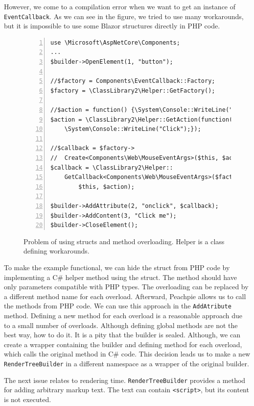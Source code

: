 However, we come to a compilation error when we want to get an instance of \texttt{EventCallback}.
As we can see in the figure, we tried to use many workarounds, but it is impossible to use some Blazor structures directly in PHP code.
\par
\begin{figure}
\begin{lstlisting}[numbers=left]
use \Microsoft\AspNetCore\Components;
...
$builder->OpenElement(1, "button");
		
//$factory = Components\EventCallback::Factory;
$factory = \ClassLibrary2\Helper::GetFactory();

//$action = function() {\System\Console::WriteLine("Click");}; 
$action = \ClassLibrary2\Helper::GetAction(function() {
	\System\Console::WriteLine("Click");});
		
//$callback = $factory->
//	Create<Components\Web\MouseEventArgs>($this, $action);
$callback = \ClassLibrary2\Helper::
	GetCallback<Components\Web\MouseEventArgs>($factory, 
		$this, $action);

$builder->AddAttribute(2, "onclick", $callback);
$builder->AddContent(3, "Click me");
$builder->CloseElement();
\end{lstlisting}
\caption{Problem of using structs and method overloading. Helper is a class defining workarounds.}
\label{img15:problems}
\end{figure}
\par
To make the example functional, we can hide the struct from PHP code by implementing a C\# helper method using the struct.
The method should have only parameters compatible with PHP types. 
The overloading can be replaced by a different method name for each overload.
Afterward, Peachpie allows us to call the methods from PHP code.
We can use this approach in the \texttt{AddAtribute} method. 
Defining a new method for each overload is a reasonable approach due to a small number of overloads.
Although defining global methods are not the best way, how to do it.
It is a pity that the builder is sealed. 
Although, we can create a wrapper containing the builder and defining method for each overload, which calls the original method in C\# code.
This decision leads us to make a new \texttt{RenderTreeBuilder}  in a different namespace as a wrapper of the original builder.
\par
The next issue relates to rendering time.
\texttt{RenderTreeBuilder} provides a method for adding arbitrary markup text.
The text can contain \texttt{<script>}, but its content is not executed.
